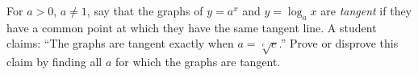 For $a>0$, $a\ne1$, say that the graphs of $y=a^x$ and $y=\log_ax$ are \emph{tangent} if they have a common point at which they have the same tangent line. A student claims: ``The graphs are tangent exactly when $a=\sqrt[e]{e}$.'' Prove or disprove this claim by finding all $a$ for which the graphs are tangent.

